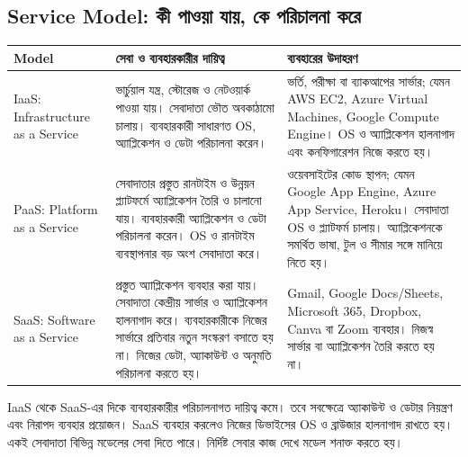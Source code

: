 \subsection{Service Model: কী পাওয়া যায়, কে পরিচালনা করে}
\label{ch2:c10-03}
\begin{tabularx}{\linewidth}{|p{.18\linewidth}|X|X|}\hline
\textbf{Model} & \textbf{সেবা ও ব্যবহারকারীর দায়িত্ব} & \textbf{ব্যবহারের উদাহরণ}\\\hline
IaaS: Infrastructure as a Service & ভার্চুয়াল যন্ত্র, স্টোরেজ ও নেটওয়ার্ক পাওয়া যায়। সেবাদাতা ভৌত অবকাঠামো চালায়। ব্যবহারকারী সাধারণত OS, অ্যাপ্লিকেশন ও ডেটা পরিচালনা করেন। & ভর্তি, পরীক্ষা বা ব্যাকআপের সার্ভার; যেমন AWS EC2, Azure Virtual Machines, Google Compute Engine। OS ও অ্যাপ্লিকেশন হালনাগাদ এবং কনফিগারেশন নিজে করতে হয়।\\\hline
PaaS: Platform as a Service\label{ch2:c10-04} & সেবাদাতার প্রস্তুত রানটাইম ও উন্নয়ন প্ল্যাটফর্মে অ্যাপ্লিকেশন তৈরি ও চালানো যায়। ব্যবহারকারী অ্যাপ্লিকেশন ও ডেটা পরিচালনা করেন। OS ও রানটাইম ব্যবস্থাপনার বড় অংশ সেবাদাতা করে। & ওয়েবসাইটের কোড স্থাপন; যেমন Google App Engine, Azure App Service, Heroku। সেবাদাতা OS ও প্ল্যাটফর্ম চালায়। অ্যাপ্লিকেশনকে সমর্থিত ভাষা, টুল ও সীমার সঙ্গে মানিয়ে নিতে হয়।\\\hline
SaaS: Software as a Service\label{ch2:c10-05} & প্রস্তুত অ্যাপ্লিকেশন ব্যবহার করা যায়। সেবাদাতা কেন্দ্রীয় সার্ভার ও অ্যাপ্লিকেশন হালনাগাদ করে। ব্যবহারকারীকে নিজের সার্ভারে প্রতিবার নতুন সংস্করণ বসাতে হয় না। নিজের ডেটা, অ্যাকাউন্ট ও অনুমতি পরিচালনা করতে হয়। & Gmail, Google Docs/Sheets, Microsoft 365, Dropbox, Canva বা Zoom ব্যবহার। নিজস্ব সার্ভার বা অ্যাপ্লিকেশন তৈরি করতে হয় না।\\\hline
\end{tabularx}
IaaS থেকে SaaS-এর দিকে ব্যবহারকারীর পরিচালনাগত দায়িত্ব কমে। তবে সবক্ষেত্রে অ্যাকাউন্ট ও ডেটার নিয়ন্ত্রণ এবং নিরাপদ ব্যবহার প্রয়োজন। SaaS ব্যবহার করলেও নিজের ডিভাইসের OS ও ব্রাউজার হালনাগাদ রাখতে হয়। একই সেবাদাতা বিভিন্ন মডেলের সেবা দিতে পারে। নির্দিষ্ট সেবার কাজ দেখে মডেল শনাক্ত করতে হয়।
